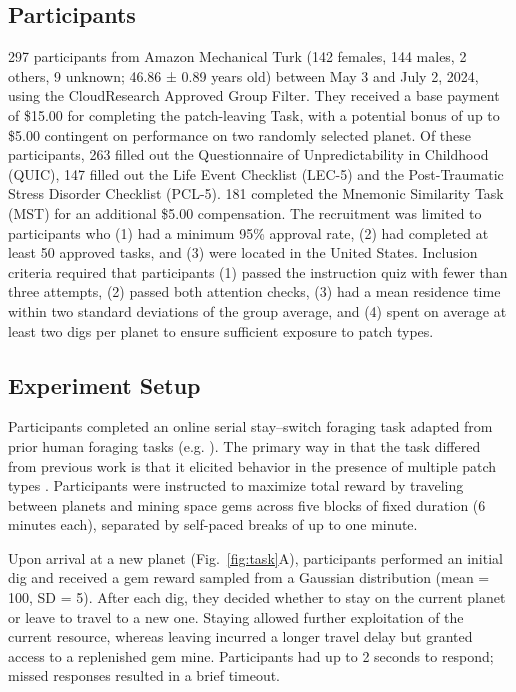 \documentclass[12pt]{article}
\begin{document}
\subsection*{Participants}

297 participants from Amazon Mechanical Turk (142 females, 144 males, 2 others, 9 unknown; 46.86 ± 0.89 years old) between May 3 and July 2, 2024, using the CloudResearch Approved Group Filter. They received a base payment of \$15.00 for completing the patch-leaving Task, with a potential bonus of up to \$5.00 contingent on performance on two randomly selected planet. Of these participants, 263 filled out the Questionnaire of Unpredictability in Childhood (QUIC), 147 filled out the Life Event Checklist (LEC-5) and the Post-Traumatic Stress Disorder Checklist (PCL-5). 181 completed the Mnemonic Similarity Task (MST) for an additional \$5.00 compensation. The recruitment was limited to participants who (1) had a minimum 95\% approval rate, (2) had completed at least 50 approved tasks, and (3) were located in the United States. Inclusion criteria required that participants (1) passed the instruction quiz with fewer than three attempts, (2) passed both attention checks, (3) had a mean residence time within two standard deviations of the group average, and (4) spent on average at least two digs per planet to ensure sufficient exposure to patch types.

\subsection*{Experiment Setup}

Participants completed an online serial stay–switch foraging task adapted from prior human foraging tasks (e.g. \citep{constantino2015learning}). The primary way in that the task differed from previous work is that it elicited behavior in the presence of multiple patch types \citep{harhen2023overharvesting,harhen2026structure}. Participants were instructed to maximize total reward by traveling between planets and mining space gems across five blocks of fixed duration (6 minutes each), separated by self-paced breaks of up to one minute.

Upon arrival at a new planet (Fig.~\ref{fig:task}A), participants performed an initial dig and received a gem reward sampled from a Gaussian distribution (mean = 100, SD = 5). After each dig, they decided whether to stay on the current planet or leave to travel to a new one. Staying allowed further exploitation of the current resource, whereas leaving incurred a longer travel delay but granted access to a replenished gem mine. Participants had up to 2 seconds to respond; missed responses resulted in a brief timeout.
\end{document}

